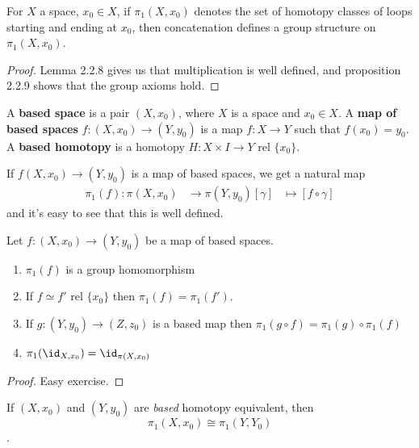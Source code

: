 \documentclass{article}
\numberwithin{nthm}{subsection}
\begin{document}
\begin{nthm}
    For $X$ a space, $x_0 \in X$, if $\pi_1 (X, x_0)$ denotes the set of homotopy classes of loops starting and ending at $x_0$, then concatenation defines a group structure on $\pi_1(X, x_0)$.
\end{nthm}

\begin{proof}
    Lemma 2.2.8 gives us that multiplication is well defined, and proposition 2.2.9 shows that the group axioms hold.
\end{proof}

\begin{defi}
    A \textbf{based space} is a pair $(X, x_0)$, where $X$ is a space and $x_0 \in X$. A \textbf{map of based spaces} $f:(X, x_0) \to (Y, y_0)$ is a map $f:X \to Y$ such that $f(x_0) = y_0$. A \textbf{based homotopy} is a homotopy $H:X \times I \to Y$ rel $\{x_0\}$.
\end{defi}

\begin{defi}
    If $f(X, x_0) \to (Y, y_0)$ is a map of based spaces, we get a natural map
    \begin{align*}
        \pi_1(f) : \pi(X, x_0) &\to \pi(Y, y_0)
        [\gamma] &\mapsto [f \circ \gamma]
    \end{align*}
    and it's easy to see that this is well defined.
\end{defi}

\begin{nprop}
    Let $f: (X, x_0) \to (Y, y_0)$ be a map of based spaces.
    \begin{enumerate}[label=(\roman*)]
        \item $\pi_1(f)$ is a group homomorphism
        \item If $f \simeq f'$ rel $\{x_0\}$ then $\pi_1(f) = \pi_1(f')$.
        \item If $g: (Y, y_0) \to (Z, z_0)$ is a based map then $\pi_1(g \circ f) = \pi_1(g) \circ \pi_1(f)$
        \item $\pi_1(\id_{X, x_0}) = \id_{\pi(X, x_0)}$
    \end{enumerate}
\end{nprop}

\begin{proof}
    Easy exercise.
\end{proof}

\begin{cor}
    If $(X, x_0)$ and $(Y, y_0)$ are \emph{based} homotopy equivalent, then \begin{equation*}\pi_1(X, x_0) \cong \pi_1(Y, Y_0)\end{equation*}.
\end{cor}
\end{document}
